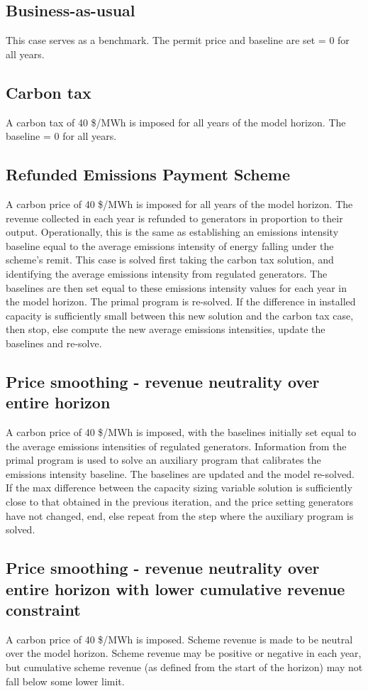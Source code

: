 \documentclass{article}
\begin{document}
\subsection{Business-as-usual}
This case serves as a benchmark. The permit price and baseline are set = 0 for all years.

\subsection{Carbon tax}
A carbon tax of 40 \$/MWh is imposed for all years of the model horizon. The baseline = 0 for all years.

\subsection{Refunded Emissions Payment Scheme}
A carbon price of 40 \$/MWh is imposed for all years of the model horizon. The revenue collected in each year is refunded to generators in proportion to their output. Operationally, this is the same as establishing an emissions intensity baseline equal to the average emissions intensity of energy falling under the scheme's remit. This case is solved first taking the carbon tax solution, and identifying the average emissions intensity from regulated generators. The baselines are then set equal to these emissions intensity values for each year in the model horizon. The primal program is re-solved. If the difference in installed capacity is sufficiently small between this new solution and the carbon tax case, then stop, else compute the new average emissions intensities, update the baselines and re-solve.

\subsection{Price smoothing - revenue neutrality over entire horizon}
A carbon price of 40 \$/MWh is imposed, with the baselines initially set equal to the average emissions intensities of regulated generators. Information from the primal program is used to solve an auxiliary program that calibrates the emissions intensity baseline. The baselines are updated and the model re-solved. If the max difference between the capacity sizing variable solution is sufficiently close to that obtained in the previous iteration, and the price setting generators have not changed, end, else repeat from the step where the auxiliary program is solved.

\subsection{Price smoothing - revenue neutrality over entire horizon with lower cumulative revenue constraint}
A carbon price of 40 \$/MWh is imposed. Scheme revenue is made to be neutral over the model horizon. Scheme revenue may be positive or negative in each year, but cumulative scheme revenue (as defined from the start of the horizon) may not fall below some lower limit. 
\end{document}
